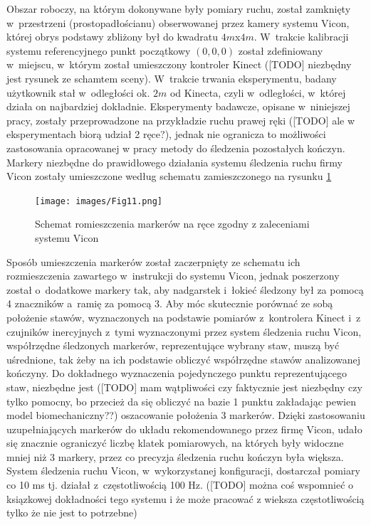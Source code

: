 Obszar roboczy, na którym dokonywane były pomiary ruchu, został zamknięty w~przestrzeni (prostopadłościanu) obserwowanej przez kamery systemu Vicon, której obrys podstawy zbliżony był do kwadratu $4m$x$4m$. W~trakcie kalibracji systemu referencyjnego punkt początkowy $\left(0, 0, 0\right)$ został zdefiniowany w~miejscu, w~którym został umieszczony kontroler Kinect ([TODO] niezbędny jest rysunek ze schamtem sceny). W~trakcie trwania eksperymentu, badany użytkownik stał w~odległości ok. $2m$ od Kinecta, czyli w~odległości, w~której działa on najbardziej dokładnie. Eksperymenty badawcze, opisane w~niniejszej pracy, zostały przeprowadzone na przykładzie ruchu prawej ręki ([TODO] ale w eksperymentach biorą udział 2 ręce?), jednak nie ogranicza to możliwości zastosowania opracowanej w pracy metody do śledzenia pozostałych kończyn. Markery niezbędne do prawidłowego działania systemu śledzenia ruchu firmy Vicon zostały umieszczone według schematu zamieszczonego na rysunku \ref{fig:experiments:viconArm}

\begin{figure}[!htp]
	\centering
	\texttt{[image: images/Fig11.png]}
	\caption{Schemat romieszczenia markerów na ręce zgodny z zaleceniami systemu Vicon}
	\label{fig:experiments:viconArm}
\end{figure}

Sposób umieszczenia markerów został zaczerpnięty ze schematu ich rozmieszczenia zawartego w~instrukcji do systemu Vicon, jednak poszerzony został o~dodatkowe markery tak, aby nadgarstek i~łokieć śledzony był za pomocą 4 znaczników a~ramię za pomocą 3. Aby móc skutecznie porównać ze sobą położenie stawów, wyznaczonych na podstawie pomiarów z~kontrolera Kinect i~z czujników inercyjnych z~tymi wyznaczonymi przez system śledzenia ruchu Vicon, współrzędne śledzonych markerów, reprezentujące wybrany staw, muszą być uśrednione, tak żeby na ich podstawie obliczyć współrzędne stawów analizowanej kończyny. Do dokładnego wyznaczenia pojedynczego punktu reprezentującego staw, niezbędne jest ([TODO] mam wątpliwości czy faktycznie jest niezbędny czy tylko pomocny, bo przecież da się obliczyć na bazie 1 punktu zakładając pewien model biomechaniczny??) oszacowanie położenia 3 markerów. Dzięki zastosowaniu uzupełniających markerów do układu rekomendowanego przez firmę Vicon, udało się znacznie ograniczyć liczbę klatek pomiarowych, na których były widoczne mniej niż 3 markery, przez co precyzja śledzenia ruchu kończyn była większa.  \\ 

System śledzenia ruchu Vicon, w~wykorzystanej konfiguracji, dostarczał pomiary co 10 ms tj. działał z~częstotliwością 100 Hz. ([TODO] można coś wspomnieć o ksiązkowej dokładności tego systemu i że może pracować z wieksza częstotliwością tylko że nie jest to potrzebne)\\

